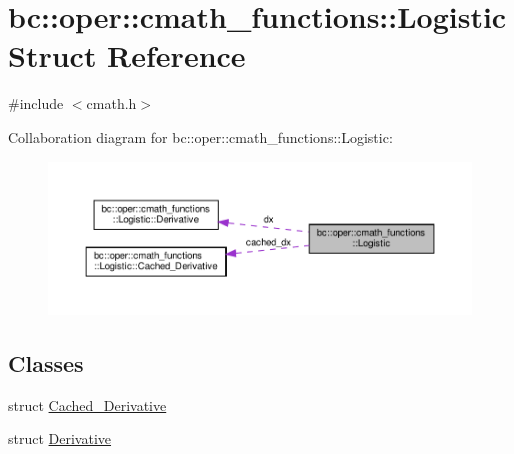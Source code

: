 \hypertarget{structbc_1_1oper_1_1cmath__functions_1_1Logistic}{}\section{bc\+:\+:oper\+:\+:cmath\+\_\+functions\+:\+:Logistic Struct Reference}
\label{structbc_1_1oper_1_1cmath__functions_1_1Logistic}


{\ttfamily \#include $<$cmath.\+h$>$}



Collaboration diagram for bc\+:\+:oper\+:\+:cmath\+\_\+functions\+:\+:Logistic\+:\nopagebreak
\begin{figure}[H]
\begin{center}
\leavevmode
\includegraphics[width=350pt]{structbc_1_1oper_1_1cmath__functions_1_1Logistic__coll__graph}
\end{center}
\end{figure}
\subsection*{Classes}
\begin{DoxyCompactItemize}
\item 
struct \hyperlink{structbc_1_1oper_1_1cmath__functions_1_1Logistic_1_1Cached__Derivative}{Cached\+\_\+\+Derivative}
\item 
struct \hyperlink{structbc_1_1oper_1_1cmath__functions_1_1Logistic_1_1Derivative}{Derivative}
\end{DoxyCompactItemize}
